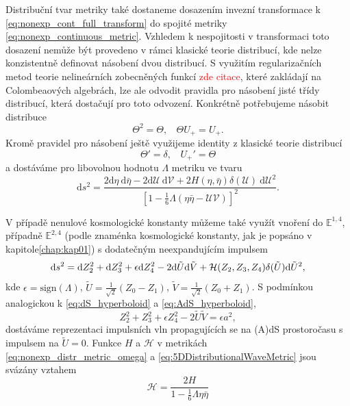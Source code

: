 Distribuční tvar metriky také dostaneme dosazením invezní transformace k \eqref{eq:nonexp_cont_full_transform} do spojité metriky 
\eqref{eq:nonexp_continuous_metric}. Vzhledem k nespojitosti v transformaci toto dosazení nemůže být provedeno
v rámci klasické teorie distribucí, kde nelze konzistentně definovat násobení dvou distribucí. S využitím regularizačních metod teorie
nelineárních zobecněných funkcí \textcolor{red}{zde citace}, které zakládají na Colombeaových algebrách, lze ale odvodit pravidla pro násobení
jisté třídy distribucí, která dostačují pro toto odvození. Konkrétně potřebujeme násobit distribuce
\begin{equation}
        \Theta^2 = \Theta, ~~~~ \Theta U_{+} = U_{+}.
\end{equation}
Kromě pravidel pro násobení ještě využijeme identity z klasické teorie distribucí
\begin{equation}
    \Theta' = \delta, ~~~~ U_{+}' = \Theta
\end{equation}
a dostáváme pro libovolnou hodnotu $\Lambda$ metriku ve tvaru
\begin{equation} \label{eq:nonexp_distr_metric_omega}
\mathrm{d}s^2=\frac{2\mathrm{d}\eta~\mathrm{d}\bar{\eta} - 2 \mathrm{d}\mathcal{U}~\mathrm{d}\mathcal{V} + 2H(\eta, \bar{\eta}) \delta(\mathcal{U}) 
~\mathrm{d}\mathcal{U}^2}{\left[1-\frac{1}{6}\Lambda(\eta \bar{\eta}-\mathcal{U}\mathcal{V})\right]^2}.
\end{equation}

V případě nenulové kosmologické konstanty můžeme také využít vnoření do $\mathbb{E}^{1,4}$, případně $\mathbb{E}^{2,4}$ (podle znaménka kosmologické
konstanty, jak je popsáno v kapitole\autoref{chap:kap01}) s dodatečným neexpandujícím impulsem
\begin{equation}
    \label{eq:5DDistributionalWaveMetric}
    \mathrm{d} s^2 = \mathrm{d} Z_2^2 + \mathrm{d} Z_3^2 + \epsilon \mathrm{d} Z_4^2 - 2 \mathrm{d} \tilde{U} \mathrm{d} \tilde{V} + \mathcal{H}(Z_2, Z_3, Z_4) \delta(\tilde{U}) \mathrm{d} \tilde{U}^2,
\end{equation}
kde $\epsilon = \text{sign} (\Lambda)$, $\tilde{U} = \tfrac{1}{\sqrt{2}}(Z_0 - Z_1)$, $\tilde{V}= \tfrac{1}{\sqrt{2}}(Z_0 + Z_1)$.
S podmínkou analogickou k \eqref{eq:dS_hyperboloid} a \eqref{eq:AdS_hyperboloid},
\begin{equation}
    Z_2^2 + Z_3^2 + \epsilon Z_4^2 - 2 \tilde{U} \tilde{V} = \epsilon a^2,
\end{equation}
dostáváme reprezentaci impulsních vln propagujících se na (A)dS prostoročasu s impulsem na $\tilde{U}=0$. 
Funkce $H$ a $\mathcal{H}$ v metrikách \eqref{eq:nonexp_distr_metric_omega} a \eqref{eq:5DDistributionalWaveMetric} jsou svázány vztahem
\begin{equation}
    \mathcal{H} = \frac{2H}{1-\frac{1}{6}\Lambda \eta \bar{\eta}}
\end{equation}

